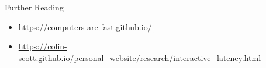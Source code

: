 \documentclass[12pt, aspectration=169]{beamer}
\begin{document}
    \begin{frame}{Further Reading}
        \begin{itemize}
            \item \url{https://computers-are-fast.github.io/}
            \item \url{https://colin-scott.github.io/personal_website/research/interactive_latency.html}
        \end{itemize}
    \end{frame}
\end{document}
